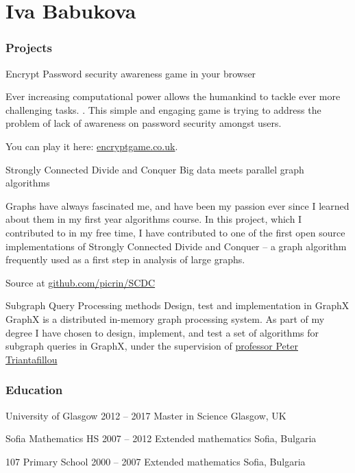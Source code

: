\documentclass{tccv}
\begin{document}
\setlength{\emergencystretch}{3em}
\part{Iva Babukova}

\section{Projects}

\begin{eventlist}

\item{Encrypt}
     {Password security awareness game in your browser}
     {Ever increasing computational power allows the humankind to tackle ever more challenging tasks. . This simple and engaging game is trying to address the problem of lack of awareness on password security amongst users. \par\medskip You can play it here: \href{encryptgame.co.uk}{encryptgame.co.uk}.
     }

\item{Strongly Connected Divide and Conquer}
   {Big data meets parallel graph algorithms}
   {Graphs have always fascinated me, and have been my passion ever since I learned about them in my first year algorithms course. In this project, which I contributed to in my free time, I have contributed to one of the first open source implementations of Strongly Connected Divide and Conquer -- a graph algorithm frequently used as a first step in analysis of large graphs. \par\medskip
   Source at
   \href{http://github.com/picrin/SCDC}{github.com/picrin/SCDC}
   }

\item{Subgraph Query Processing methods}
    {Design, test and implementation in GraphX}
    {GraphX is a distributed in-memory graph processing system. As part of my degree I have chosen to design, implement, and test a set of algorithms for subgraph queries in GraphX, under the supervision of \href{http://www.gla.ac.uk/schools/computing/staff/petertriantafillou}{professor Peter Triantafillou}}

\end{eventlist}

\section{Education}

\begin{yearlist}

\item[University of Glasgow]
     {2012 -- 2017}
     {Master in Science}
     {Glasgow, UK}

\item[Sofia Mathematics HS]
     {2007 -- 2012}
     {Extended mathematics}
     {Sofia, Bulgaria}

\item[107 Primary School]
     {2000 -- 2007}
     {Extended mathematics}
     {Sofia, Bulgaria}
\end{yearlist}
\end{document}
